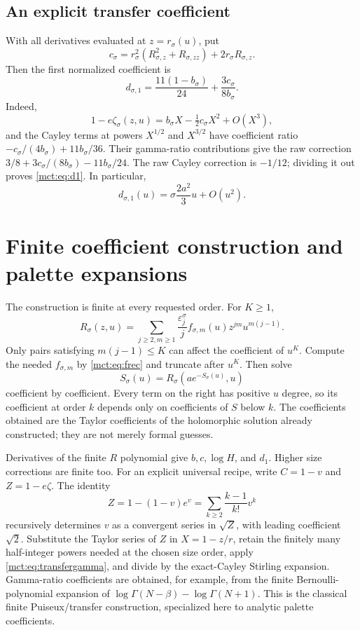 \documentclass[11pt]{article}
\theoremstyle{definition}
\newcommand{\Cay}{C}
\newcommand{\eps}{\varepsilon}
\begin{document}
\subsection{An explicit transfer coefficient}
With all derivatives evaluated at $z=r_\sigma(u)$, put
\[
 c_\sigma=r_\sigma^2(R_{\sigma,z}^2+R_{\sigma,zz})+2r_\sigma R_{\sigma,z}.
\]
Then the first normalized coefficient is
\begin{equation}\label{mct:eq:d1}
 d_{\sigma,1}=\frac{11(1-b_\sigma)}{24}+\frac{3c_\sigma}{8b_\sigma}.
\end{equation}
Indeed,
\[
 1-e\zeta_\sigma(z,u)=b_\sigma X-\tfrac12c_\sigma X^2+O(X^3),
\]
and the Cayley terms at powers $X^{1/2}$ and $X^{3/2}$ have coefficient ratio
$-c_\sigma/(4b_\sigma)+11b_\sigma/36$. Their gamma-ratio contributions give the raw correction
$3/8+3c_\sigma/(8b_\sigma)-11b_\sigma/24$. The raw Cayley correction is $-1/12$; dividing it out proves \eqref{mct:eq:d1}. In particular,
\begin{equation}\label{mct:eq:d1leading}
 d_{\sigma,1}(u)=\sigma\frac{2a^2}{3}u+O(u^2).
\end{equation}

\section{Finite coefficient construction and palette expansions}\label{mct:sec:jets}
The construction is finite at every requested order. For $K\ge1$,
\begin{equation}\label{mct:eq:finiteR}
 R_\sigma(z,u)=\sum_{j\ge2,m\ge1}\frac{\eps_j^\sigma}{j}
 f_{\sigma,m}(u)z^{jm}u^{m(j-1)}.
\end{equation}
Only pairs satisfying $m(j-1)\le K$ can affect the coefficient of $u^K$. Compute the needed $f_{\sigma,m}$ by \eqref{mct:eq:frec} and truncate after $u^K$. Then solve
\begin{equation}\label{mct:eq:Simplicit}
 S_\sigma(u)=R_\sigma(ae^{-S_\sigma(u)},u)
\end{equation}
coefficient by coefficient. Every term on the right has positive $u$ degree, so its coefficient at order $k$ depends only on coefficients of $S$ below $k$. The coefficients obtained are the Taylor coefficients of the holomorphic solution already constructed; they are not merely formal guesses.

Derivatives of the finite $R$ polynomial give $b,c,\log H$, and $d_1$. Higher size corrections are finite too. For an explicit universal recipe, write $\Cay=1-v$ and $Z=1-e\zeta$. The identity
\[
 Z=1-(1-v)e^v=\sum_{k\ge2}\frac{k-1}{k!}v^k
\]
recursively determines $v$ as a convergent series in $\sqrt Z$, with leading coefficient $\sqrt2$. Substitute the Taylor series of $Z$ in $X=1-z/r$, retain the finitely many half-integer powers needed at the chosen size order, apply \eqref{mct:eq:transfergamma}, and divide by the exact-Cayley Stirling expansion. Gamma-ratio coefficients are obtained, for example, from the finite Bernoulli-polynomial expansion of $\log\Gamma(N-\beta)-\log\Gamma(N+1)$. This is the classical finite Puiseux/transfer construction, specialized here to analytic palette coefficients.
\end{document}

